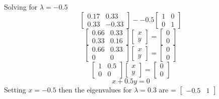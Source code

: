 \documentclass[12pt,a4paper]{paper}
\begin{document}
\begin{enumerate}
\begin{enumerate}
Solving for $\lambda = -0.5$
\begin{equation}
\left[\begin{array}{cc}0.17 & 0.33 \\ 0.33 & -0.33\end{array}\right] - -0.5 \left[\begin{array}{cc}1 & 0 \\0 & 1\end{array}\right]
\end{equation}
\begin{equation}
\left[\begin{array}{cc}0.66 & 0.33 \\ 0.33 & 0.16\end{array}\right]\left[\begin{array}{c}x\\y\end{array}\right] = \left[\begin{array}{c}0\\0\end{array}\right]
\end{equation}
\begin{equation}
\left[\begin{array}{cc}0.66 & 0.33 \\ 0 & 0\end{array}\right]\left[\begin{array}{c}x\\y\end{array}\right] = \left[\begin{array}{c}0\\0\end{array}\right]
\end{equation}
\begin{equation}
\left[\begin{array}{cc} 1 & 0.5 \\ 0 & 0\end{array}\right]\left[\begin{array}{c}x\\y\end{array}\right] = \left[\begin{array}{c}0\\0\end{array}\right]
\end{equation}
\begin{equation}
x + 0.5 y = 0
\end{equation}
Setting $x = -0.5$ then the eigenvalues for $\lambda = 0.3$ are = $\left[\begin{array}{cc}-0.5 &  1\end{array}\right]$

\end{enumerate}
\end{enumerate}
\end{document}
